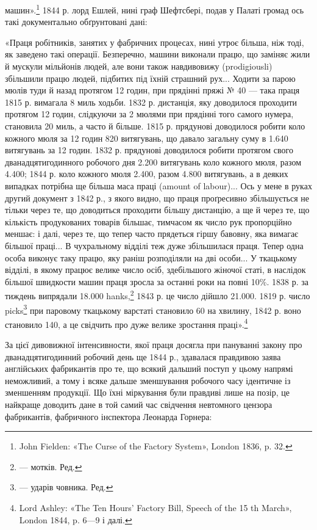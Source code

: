 \parcont{}  %
машин».\footnote{
John Fielden: «The Curse of the Factory System», London
1836, p. 32.
} 1844 р. лорд Ешлей, нині граф Шефтсбері, подав
у Палаті громад ось такі документально обґрунтовані дані:

«Праця робітників, занятих у фабричних процесах, нині утроє
більша, ніж тоді, як заведено такі операції. Безперечно, машини
виконали працю, що заміняє жили й мускули мільйонів людей,
але вони також навдивовижу (prodigiousli) збільшили працю
людей, підбитих під їхній страшний рух... Ходити за парою
мюлів туди й назад протягом 12 годин, при прядінні пряжі
№ 40 — така праця 1815 р. вимагала 8 миль ходьби. 1832 р.
дистанція, яку доводилося проходити протягом 12 годин, слідкуючи
за 2 мюлями при прядінні того самого нумера, становила
20 миль, а часто й більше. 1815 р. прядунові доводилося робити
коло кожного мюля за 12 годин 820 витягувань, що давало загальну
суму в 1.640 витягувань за 12 годин. 1832 р. прядунові
доводилося робити протягом свого дванадцятигодинного робочого
дня 2.200 витягувань коло кожного мюля, разом 4.400; 1844 р.
коло кожного мюля 2.400, разом 4.800 витягувань, а в деяких
випадках потрібна ще більша маса праці (amount of labour)...
Ось у мене в руках другий документ з 1842 р., з якого видно,
що праця проґресивно збільшується не тільки через те, що доводиться
проходити більшу дистанцію, а ще й через те, що кількість
продукованих товарів більшає, тимчасом як число рук пропорційно
меншає: і далі, через те, що тепер часто прядеться гіршу
бавовну, яка вимагає більшої праці... В чухральному відділі
теж дуже збільшилася праця. Тепер одна особа виконує таку
працю, яку раніш розподіляли на дві особи... У ткацькому відділі,
в якому працює велике число осіб, здебільшого жіночої
статі, в наслідок більшої швидкости машин праця зросла за
останні роки на повні 10\%. 1838 р. за тиждень випрядали 18.000
hanks,\footnote*{
— мотків. Ред.
} 1843 р. це число дійшло 21.000. 1819 р. число picks\footnote*{
— ударів човника. Ред.
}
при паровому ткацькому варстаті становило 60 на хвилину, 1842 р.
воно становило 140, а це свідчить про дуже велике зростання
праці».\footnote{
Lord Ashley: «The Ten Hours’ Factory Bill, Speech of the 15 th
March», London 1844, p. 6—9 і далі.
}

За цієї дивовижної інтенсивности, якої праця досягла при пануванні
закону про дванадцятигодинний робочий день ще 1844 р.,
здавалася правдивою заява англійських фабрикантів про те,
що всякий дальший поступ у цьому напрямі неможливий, а
тому і всяке дальше зменшування робочого часу ідентичне із
зменшенням продукції. Що їхні міркування були правдиві лише
на позір, це найкраще доводить дане в той самий час свідчення
невтомного цензора фабрикантів, фабричного інспектора Леонарда
Горнера:
